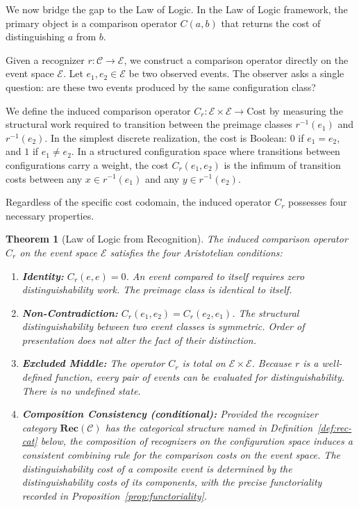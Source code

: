 \documentclass[11pt,a4paper]{article}
\newtheorem{theorem}{Theorem}
\theoremstyle{definition}
\theoremstyle{remark}
\begin{document}
We now bridge the gap to the Law of Logic. In the Law of Logic framework, the primary object is a comparison operator $C(a, b)$ that returns the cost of distinguishing $a$ from $b$.

Given a recognizer $r : \mathcal{C} \to \mathcal{E}$, we construct a comparison operator directly on the event space $\mathcal{E}$. Let $e_1, e_2 \in \mathcal{E}$ be two observed events. The observer asks a single question: are these two events produced by the same configuration class?

We define the induced comparison operator $C_r : \mathcal{E} \times \mathcal{E} \to \mathrm{Cost}$ by measuring the structural work required to transition between the preimage classes $r^{-1}(e_1)$ and $r^{-1}(e_2)$. In the simplest discrete realization, the cost is Boolean: $0$ if $e_1 = e_2$, and $1$ if $e_1 \neq e_2$. In a structured configuration space where transitions between configurations carry a weight, the cost $C_r(e_1, e_2)$ is the infimum of transition costs between any $x \in r^{-1}(e_1)$ and any $y \in r^{-1}(e_2)$.

Regardless of the specific cost codomain, the induced operator $C_r$ possesses four necessary properties.

\begin{theorem}[Law of Logic from Recognition]
\label{thm:induced-logic}
The induced comparison operator $C_r$ on the event space $\mathcal{E}$ satisfies the four Aristotelian conditions:
\begin{enumerate}
\item \textbf{Identity:} $C_r(e, e) = 0$. An event compared to itself requires zero distinguishability work. The preimage class is identical to itself.
\item \textbf{Non-Contradiction:} $C_r(e_1, e_2) = C_r(e_2, e_1)$. The structural distinguishability between two event classes is symmetric. Order of presentation does not alter the fact of their distinction.
\item \textbf{Excluded Middle:} The operator $C_r$ is total on $\mathcal{E} \times \mathcal{E}$. Because $r$ is a well-defined function, every pair of events can be evaluated for distinguishability. There is no undefined state.
\item \textbf{Composition Consistency (conditional):} \emph{Provided
the recognizer category $\mathbf{Rec}(\mathcal{C})$ has the
categorical structure named in
Definition~\ref{def:rec-cat} below}, the composition of recognizers
on the configuration space induces a consistent combining rule for
the comparison costs on the event space. The distinguishability cost
of a composite event is determined by the distinguishability costs of
its components, with the precise functoriality recorded in
Proposition~\ref{prop:functoriality}.
\end{enumerate}
\end{theorem}
\end{document}
